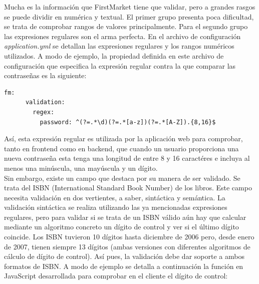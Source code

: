 \documentclass[a4paper]{report}
\begin{document}
    Mucha es la información que FirstMarket tiene que validar, pero a grandes rasgos se puede dividir en numérica y textual. El primer grupo presenta poca dificultad, se trata de comprobar rangos de valores principalmente. Para el segundo grupo las expresiones regulares son el arma perfecta. En el archivo de configuración \emph{application.yml} se detallan las expresiones regulares y los rangos numéricos utilizados. A modo de ejemplo, la propiedad definida en este archivo de configuración que especifica la expresión regular contra la que comparar las contraseñas es la siguiente:
    \\
     
    \begin{lstlisting}[caption=Expresión regular para las contraseñas]
    fm:
      validation:
        regex:
          password: ^(?=.*\d)(?=.*[a-z])(?=.*[A-Z]).{8,16}$
    \end{lstlisting}
    
    Así, esta expresión regular es utilizada por la aplicación web para comprobar, tanto en frontend como en backend, que cuando un usuario proporciona una nueva contraseña esta tenga una longitud de entre 8 y 16 caractéres e incluya al menos una minúscula, una mayúscula y un dígito.
    \\
    
    Sin embargo, existe un campo que destaca por su manera de ser validado. Se trata del ISBN (International Standard Book Number) de los libros. Este campo necesita validación en dos vertientes, a saber, sintáctica y semántica. La validación sintáctica se realiza utilizando las ya mencionadas expresiones regulares, pero para validar si se trata de un ISBN válido aún hay que calcular mediante un algoritmo concreto un dígito de control y ver si el último dígito coincide. Los ISBN tuvieron 10 dígitos hasta diciembre de 2006 pero, desde enero de 2007, tienen siempre 13 dígitos (ambas versiones con diferentes algoritmos de cálculo de dígito de control). Así pues, la validación debe dar soporte a ambos formatos de ISBN. A modo de ejemplo se detalla a continuación la función en JavaScript desarrollada para comprobar en el cliente el dígito de control:
    \\
    
\end{document}
